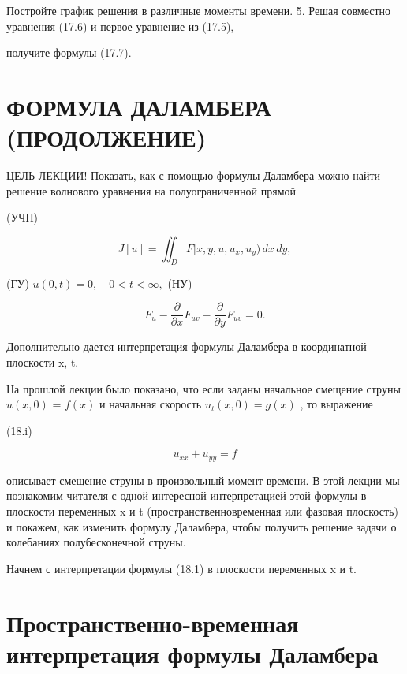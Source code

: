 \documentclass[
  ukrainian,
]{article}
\begin{document}
Постройте график решения в различные моменты времени. 5. Решая совместно
уравнения (17.6) и первое уравнение из (17.5),

получите формулы (17.7).

\section{ФОРМУЛА ДАЛАМБЕРА
(ПРОДОЛЖЕНИЕ)}\label{ux444ux43eux440ux43cux443ux43bux430-ux434ux430ux43bux430ux43cux431ux435ux440ux430-ux43fux440ux43eux434ux43eux43bux436ux435ux43dux438ux435}

ЦЕЛЬ ЛЕКЦИИ! Показать, как с помощью формулы Даламбера можно найти
решение волнового уравнения на полуограниченной прямой

(УЧП)

\[
J[u] = \iint_D F[x, y, u, u_x, u_y) \, dx \, dy,
\]

(ГУ) \(u(0, t) = 0, \quad 0 < t < \infty,\) (НУ)

\[
F_{u} - \frac{\partial}{\partial x} F_{uv} - \frac{\partial}{\partial y} F_{uv} = 0.
\]

Дополнительно дается интерпретация формулы Даламбера в координатной
плоскости x, t.

На прошлой лекции было показано, что если заданы начальное смещение
струны \(u(x, 0)\) = \(f(x)\) и начальная скорость \(u_t(x, 0) = g(x)\)
, то выражение

(18.i)

\[
u_{xx} + u_{yy} = f
\]

описывает смещение струны в произвольный момент времени. В этой лекции
мы познакомим читателя с одной интересной интерпретацией этой формулы в
плоскости переменных x и t (пространственновременная или фазовая
плоскость) и покажем, как изменить формулу Даламбера, чтобы получить
решение задачи о колебаниях полубесконечной струны.

Начнем с интерпретации формулы (18.1) в плоскости переменных x и t.

\section{Пространственно-временная интерпретация формулы
Даламбера}\label{ux43fux440ux43eux441ux442ux440ux430ux43dux441ux442ux432ux435ux43dux43dux43e-ux432ux440ux435ux43cux435ux43dux43dux430ux44f-ux438ux43dux442ux435ux440ux43fux440ux435ux442ux430ux446ux438ux44f-ux444ux43eux440ux43cux443ux43bux44b-ux434ux430ux43bux430ux43cux431ux435ux440ux430}
\end{document}

